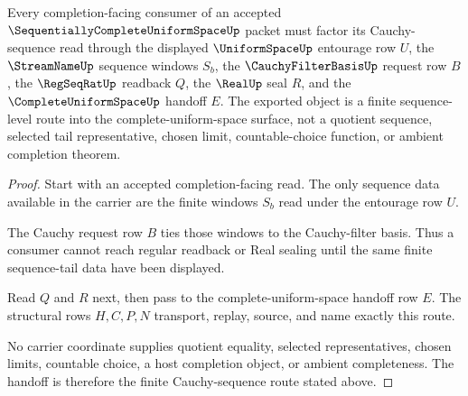 \begin{theorem}
\label{thm:sequentially-complete-uniform-space-cauchy-sequence-handoff}
Every completion-facing consumer of an accepted $\SequentiallyCompleteUniformSpaceUp$ packet must factor its Cauchy-sequence read through the displayed $\UniformSpaceUp$ entourage row $U$, the $\StreamNameUp$ sequence windows $S_b$, the $\CauchyFilterBasisUp$ request row $B$, the $\RegSeqRatUp$ readback $Q$, the $\RealUp$ seal $R$, and the $\CompleteUniformSpaceUp$ handoff $E$. The exported object is a finite sequence-level route into the complete-uniform-space surface, not a quotient sequence, selected tail representative, chosen limit, countable-choice function, or ambient completion theorem.
\end{theorem}
\begin{proof}
Start with an accepted completion-facing read. The only sequence data available in the carrier are the finite windows $S_b$ read under the entourage row $U$.

The Cauchy request row $B$ ties those windows to the Cauchy-filter basis. Thus a consumer cannot reach regular readback or Real sealing until the same finite sequence-tail data have been displayed.

Read $Q$ and $R$ next, then pass to the complete-uniform-space handoff row $E$. The structural rows $H,C,P,N$ transport, replay, source, and name exactly this route.

No carrier coordinate supplies quotient equality, selected representatives, chosen limits, countable choice, a host completion object, or ambient completeness. The handoff is therefore the finite Cauchy-sequence route stated above.
\end{proof}




